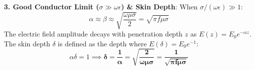 \begin{theorysol}
\textbf{3. Good Conductor Limit ($\sigma \gg \omega\epsilon$) \& Skin Depth}:
When $\sigma/(\omega\epsilon) \gg 1$:
\begin{equation}
\alpha \approx \beta \approx \sqrt{\frac{\omega \mu \sigma}{2}} = \sqrt{\pi f \mu \sigma}
\end{equation}
The electric field amplitude decays with penetration depth $z$ as $E(z) = E_0 e^{-\alpha z}$.
The skin depth $\delta$ is defined as the depth where $E(\delta) = E_0 e^{-1}$:
\begin{equation}
\alpha \delta = 1 \implies \mathbf{\delta = \frac{1}{\alpha} = \sqrt{\frac{2}{\omega \mu \sigma}} = \frac{1}{\sqrt{\pi f \mu \sigma}}}
\end{equation}
\end{theorysol}
\vspace{4mm}

